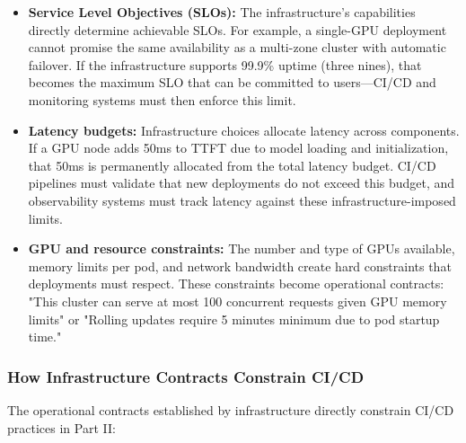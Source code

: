\begin{itemize}
    \item \textbf{Service Level Objectives (SLOs):} The infrastructure's capabilities directly determine achievable SLOs. For example, a single-GPU deployment cannot promise the same availability as a multi-zone cluster with automatic failover. If the infrastructure supports 99.9\% uptime (three nines), that becomes the maximum SLO that can be committed to users—CI/CD and monitoring systems must then enforce this limit.
    
    \item \textbf{Latency budgets:} Infrastructure choices allocate latency across components. If a GPU node adds 50ms to TTFT due to model loading and initialization, that 50ms is permanently allocated from the total latency budget. CI/CD pipelines must validate that new deployments do not exceed this budget, and observability systems must track latency against these infrastructure-imposed limits.
    
    \item \textbf{GPU and resource constraints:} The number and type of GPUs available, memory limits per pod, and network bandwidth create hard constraints that deployments must respect. These constraints become operational contracts: "This cluster can serve at most 100 concurrent requests given GPU memory limits" or "Rolling updates require 5 minutes minimum due to pod startup time."
\end{itemize}

\subsubsection{How Infrastructure Contracts Constrain CI/CD}

The operational contracts established by infrastructure directly constrain CI/CD practices in Part II:

